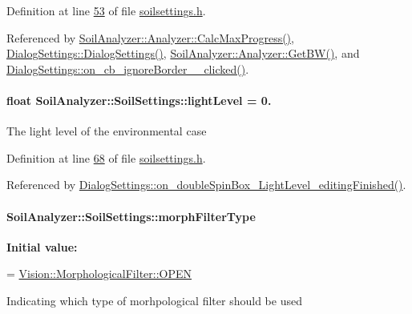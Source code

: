 Definition at line \hyperlink{soilsettings_8h_source_l00053}{53} of file \hyperlink{soilsettings_8h_source}{soilsettings.\+h}.



Referenced by \hyperlink{analyzer_8cpp_source_l00112}{Soil\+Analyzer\+::\+Analyzer\+::\+Calc\+Max\+Progress()}, \hyperlink{dialogsettings_8cpp_source_l00005}{Dialog\+Settings\+::\+Dialog\+Settings()}, \hyperlink{analyzer_8cpp_source_l00236}{Soil\+Analyzer\+::\+Analyzer\+::\+Get\+B\+W()}, and \hyperlink{dialogsettings_8cpp_source_l00389}{Dialog\+Settings\+::on\+\_\+cb\+\_\+ignore\+Border\+\_\+\_\+clicked()}.

\hypertarget{class_soil_analyzer_1_1_soil_settings_aa4d3ed8c1ab6551bfa4763e8a1ffc148}{}
\paragraph[{light\+Level}]{\setlength{\rightskip}{0pt plus 5cm}float Soil\+Analyzer\+::\+Soil\+Settings\+::light\+Level = 0.}\label{class_soil_analyzer_1_1_soil_settings_aa4d3ed8c1ab6551bfa4763e8a1ffc148}
The light level of the environmental case 

Definition at line \hyperlink{soilsettings_8h_source_l00068}{68} of file \hyperlink{soilsettings_8h_source}{soilsettings.\+h}.



Referenced by \hyperlink{dialogsettings_8cpp_source_l00290}{Dialog\+Settings\+::on\+\_\+double\+Spin\+Box\+\_\+\+Light\+Level\+\_\+editing\+Finished()}.

\hypertarget{class_soil_analyzer_1_1_soil_settings_ad1420c4800badb3eb07eba4767e3df81}{}
\paragraph[{morph\+Filter\+Type}]{ Soil\+Analyzer\+::\+Soil\+Settings\+::morph\+Filter\+Type}\label{class_soil_analyzer_1_1_soil_settings_ad1420c4800badb3eb07eba4767e3df81}
{\bfseries Initial value\+:}
\begin{DoxyCode}
=
      \hyperlink{class_vision_1_1_morphological_filter_a1f19c9cb13f0d68778c77d6fd0370868afd436eed00afa15b23eeac4de3509303}{Vision::MorphologicalFilter::OPEN}
\end{DoxyCode}
Indicating which type of morhpological filter should be used 

